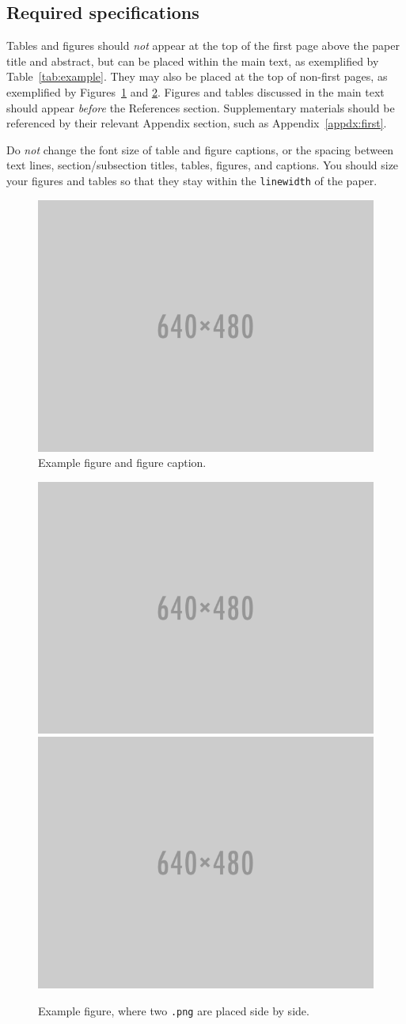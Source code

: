 \documentclass{anthology-ch}         %
\begin{document}
\subsection{Required specifications}

Tables and figures should \textit{not} appear at the top of the first page above the paper title and abstract, but can be placed within the main text, as exemplified by Table~\ref{tab:example}. They may also be placed at the top of non-first pages, as exemplified by Figures~\ref{fig:example} and \ref{fig:example_bigger}. Figures and tables discussed in the main text should appear \textit{before} the References section. Supplementary materials should be referenced by their relevant Appendix section, such as Appendix~\ref{appdx:first}. 

Do \textit{not} change the font size of table and figure captions, or the spacing between text lines, section/subsection titles, tables, figures, and captions. You should size your figures and tables so that they stay within the \texttt{linewidth} of the paper. 

\begin{figure}[t!]
  \centering
  \includegraphics[width=0.4\linewidth]{640x480.png}
  \caption{Example figure and figure caption.}
  \label{fig:example}
\end{figure}

\begin{figure}[t!]
  \centering
  \includegraphics[width=0.4\linewidth]{640x480.png}
  \includegraphics[width=0.4\linewidth]{640x480.png}
  \caption{Example figure, where two \texttt{.png} are placed side by side.}
  \label{fig:example_bigger}
\end{figure}
\end{document}
